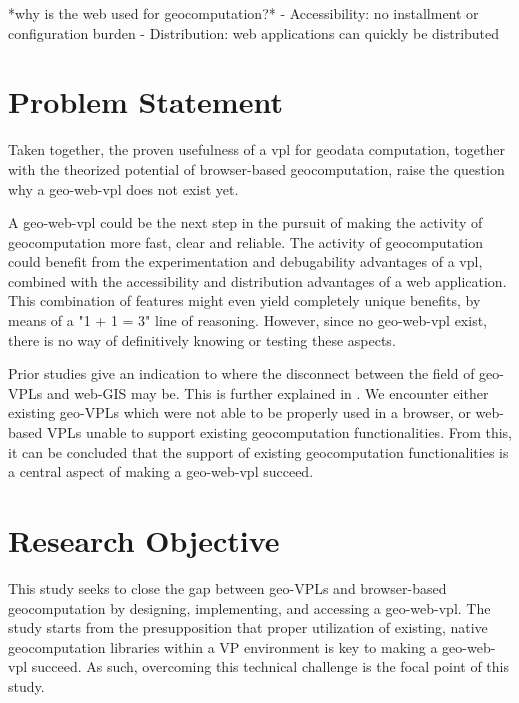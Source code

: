 
*why is the web used for geocomputation?*
- Accessibility: no installment or configuration burden
- Distribution: web applications can quickly be distributed


\section{Problem Statement}
Taken together, the proven usefulness of a vpl for geodata computation, together with the theorized potential of browser-based geocomputation, raise the question why a \ac{geo-web-vpl} does not exist yet.

A \ac{geo-web-vpl} could be the next step in the pursuit of making the activity of geocomputation more fast, clear and reliable.
The activity of geocomputation could benefit from the experimentation and debugability advantages of a \ac{vpl}, combined with the accessibility and distribution advantages of a web application. This combination of features might even yield completely unique benefits, by means of a "1 + 1 = 3" line of reasoning.
However, since no geo-web-vpl exist, there is no way of definitively knowing or testing these aspects. 

Prior studies give an indication to where the disconnect between the field of geo-VPLs and web-GIS may be. This is further explained in .
We encounter either existing geo-VPLs which were not able to be properly used in a browser, or web-based VPLs unable to support existing geocomputation functionalities. From this, it can be concluded that the support of existing geocomputation functionalities is a central aspect of making a geo-web-vpl succeed. 


\section{Research Objective}
This study seeks to close the gap between geo-VPLs and browser-based geocomputation by designing, implementing, and accessing a \ac{geo-web-vpl}.
The study starts from the presupposition that proper utilization of existing, native geocomputation libraries within a VP environment is key to making a geo-web-vpl succeed. 
As such, overcoming this technical challenge is the focal point of this study. 

